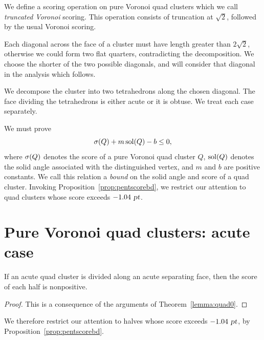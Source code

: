 We define a scoring operation on pure Voronoi quad clusters which we
call {\em truncated Voronoi} scoring.  This operation consists of
truncation at $\sqrt{2}$, followed by the usual Voronoi scoring.

Each diagonal across the face of a cluster must have length
greater than $2\sqrt{2}$, otherwise we could form two flat quarters,
contradicting the decomposition.  We choose the shorter of the two
possible diagonals, and will consider that diagonal in the analysis
which follows.

We decompose the cluster into two tetrahedrons along the chosen
diagonal.  The face dividing the tetrahedrons is either acute or
it is obtuse.  We treat each case separately.

We must prove
\[
\operatorname{\sigma}(Q) + m \operatorname{sol}(Q) - b \le 0,
\]
where $\operatorname{\sigma}(Q)$ denotes the score of a pure Voronoi quad cluster $Q$, $\operatorname{sol}(Q)$ denotes
the solid angle associated with the distinguished vertex, and $m$
and $b$ are positive constants.
We call this relation a {\em bound} on the solid angle and score of a quad
cluster.
Invoking Proposition~\ref{prop:pentscorebd},
we restrict our attention to
quad clusters whose score exceeds $-1.04 \text{ \sl pt}$.

\section{Pure Voronoi quad clusters:  acute case}
\begin{lem}
\label{lem:pure:half} If an acute quad cluster is divided along an
acute separating face, then the score of each half is nonpositive.
\end{lem}
\begin{proof}
This is a consequence of the arguments of
Theorem~\ref{lemma:quad0}\tomcite.
\end{proof}

We therefore restrict our attention to halves whose score exceeds
$-1.04 \text{ \sl pt}$, by Proposition~\ref{prop:pentscorebd}.

